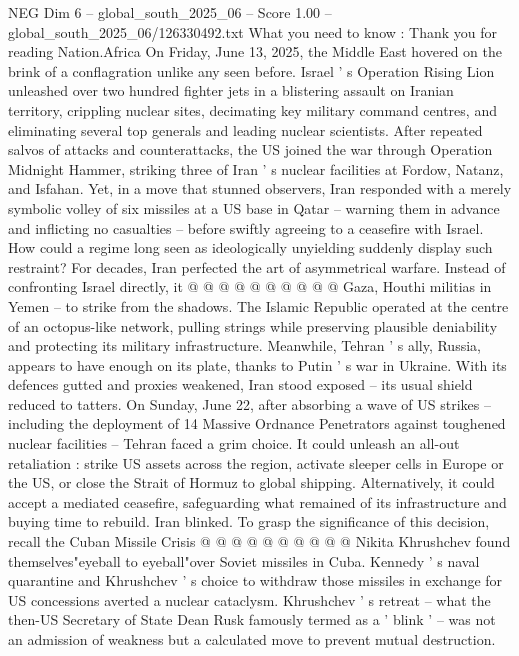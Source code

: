 \begin{textsample}{NEG Dim 6 – global\_south\_2025\_06 – Score 1.00 – global\_south\_2025\_06/126330492.txt}  \label{ex:f6_neg_432}
What you need to know : Thank you for reading Nation.Africa On Friday, June 13, 2025, the Middle East hovered on the brink of a conflagration unlike any seen before.
Israel ' s Operation Rising Lion unleashed over two hundred fighter jets in a blistering assault on Iranian territory, crippling nuclear sites, decimating key military command centres, and eliminating several top generals and leading nuclear scientists.
After repeated salvos of attacks and counterattacks, the US joined the war through Operation Midnight Hammer, striking three of Iran ' s nuclear facilities at Fordow, Natanz, and Isfahan.
Yet, in a move that stunned observers, Iran responded with a merely symbolic volley of six missiles at a US base in Qatar -- warning them in advance and inflicting no casualties -- before swiftly agreeing to a ceasefire with Israel.
How could a regime long seen as ideologically unyielding suddenly display such restraint?
For decades, Iran perfected the art of asymmetrical warfare.
Instead of confronting Israel directly, it @ @ @ @ @ @ @ @ @ @ Gaza, Houthi militias in Yemen -- to strike from the shadows.
The Islamic Republic operated at the centre of an octopus-like network, pulling strings while preserving plausible deniability and protecting its military infrastructure.
Meanwhile, Tehran ' s ally, Russia, appears to have enough on its plate, thanks to Putin ' s war in Ukraine.
With its defences gutted and proxies weakened, Iran stood exposed -- its usual shield reduced to tatters.
On Sunday, June 22, after absorbing a wave of US strikes -- including the deployment of 14 Massive Ordnance Penetrators against toughened nuclear facilities -- Tehran faced a grim choice.
It could unleash an all-out retaliation : strike US assets across the region, activate sleeper cells in Europe or the US, or close the Strait of Hormuz to global shipping.
Alternatively, it could accept a mediated ceasefire, safeguarding what remained of its infrastructure and buying time to rebuild.
Iran blinked.
To grasp the significance of this decision, recall the Cuban Missile Crisis @ @ @ @ @ @ @ @ @ @ Nikita Khrushchev found themselves"eyeball to eyeball"over Soviet missiles in Cuba.
Kennedy ' s naval quarantine and Khrushchev ' s choice to withdraw those missiles in exchange for US concessions averted a nuclear cataclysm.
Khrushchev ' s retreat -- what the then-US Secretary of State Dean Rusk famously termed as a ' blink ' -- was not an admission of weakness but a calculated move to prevent mutual destruction.

\end{textsample}
